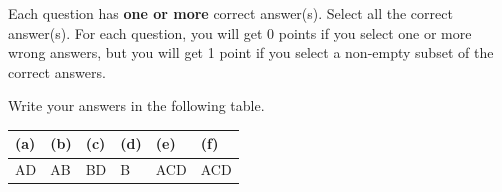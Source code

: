 
Each question has \textbf{one or more} correct answer(s). Select all the correct answer(s). For each question, you will get 0 points if you select one or more wrong answers, but you will get 1 point if you select a non-empty subset of the correct answers.

Write your answers in the following table.


\begin{table}[htbp]
	\centering
	\begin{tabular}{|p{2cm}|p{2cm}|p{2cm}|p{2cm}|p{2cm}|p{2cm}|}
		\hline 
		(a) & (b) & (c) & (d) & (e) & (f) \\
		\hline
		  AD & AB & BD & B & ACD & ACD \\
		\hline
	\end{tabular} 
\end{table}

